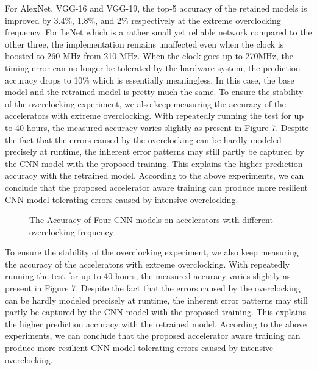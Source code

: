   For AlexNet, VGG-16 and VGG-19, the top-5 accuracy of the retained models is improved by 3.4\%, 1.8\%, and 2\% 
respectively at the extreme overclocking frequency. For LeNet which is a rather small yet reliable network 
compared to the other three, the implementation remains unaffected even when the clock is boosted to 260 MHz 
from 210 MHz. When the clock goes up to 270MHz, the timing error can no longer be tolerated by the hardware system, 
the prediction accuracy drops to 10\% which is essentially meaningless. In this case, the base model 
and the retrained model is pretty much the same. To ensure the stability of the overclocking experiment, 
we also keep measuring the accuracy of the accelerators with extreme overclocking. With repeatedly 
running the test for up to 40 hours, the measured accuracy varies slightly as present in Figure 7. 
Despite the fact that the errors caused by the overclocking can be hardly modeled precisely at runtime, 
the inherent error patterns may still partly be captured by the CNN model with the proposed training. 
This explains the higher prediction accuracy with the retrained model. According to the 
above experiments, we can conclude that the proposed accelerator aware training can produce 
more resilient CNN model tolerating errors caused by intensive overclocking. 

\begin{figure*}
        \center
	\qquad
	\qquad
        \qquad
	\caption{The Accuracy of Four CNN models on accelerators with different overclocking frequency}
        \label{fig:overclock accuracy}
\end{figure*}

To ensure the stability of the overclocking experiment, we 
also keep measuring the accuracy of the accelerators with extreme 
overclocking. With repeatedly running the test for up to 40 hours, 
the measured accuracy varies slightly as present in Figure 7. 
Despite the fact that the errors caused by the overclocking can be 
hardly modeled precisely at runtime, the inherent error patterns may 
still partly be captured by the CNN model with the proposed training. 
This explains the higher prediction accuracy with the retrained model. 
According to the above experiments, we can conclude that the proposed 
accelerator aware training can produce more resilient CNN model tolerating 
errors caused by intensive overclocking. 

